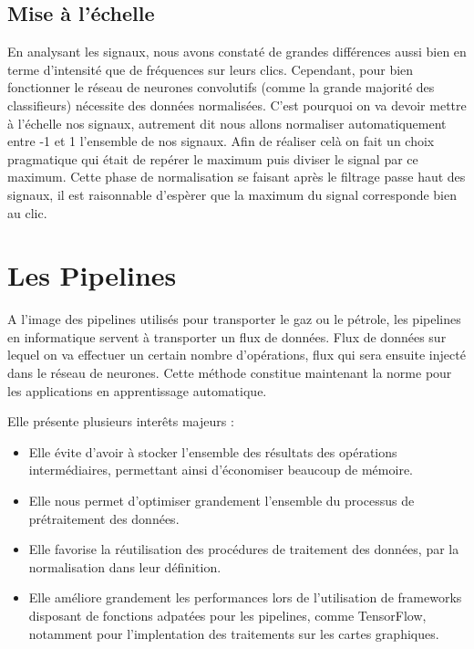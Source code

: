 \hypertarget{Mise-a-l-echelle}{%
\subsection{Mise à l'échelle}
\label{Mise-a-l-echelle}}

En analysant les signaux, nous avons constaté de grandes différences aussi bien en terme d'intensité que de fréquences sur leurs clics.
Cependant, pour bien fonctionner le réseau de neurones convolutifs (comme la grande majorité des classifieurs) nécessite des données normalisées. 
C'est pourquoi on va devoir mettre à l'échelle nos signaux, autrement dit nous allons normaliser automatiquement entre -1 et 1 l'ensemble de nos signaux.
Afin de réaliser celà on fait un choix pragmatique qui était de repérer le maximum puis diviser le signal par ce maximum. 
Cette phase de normalisation se faisant après le filtrage passe haut des signaux,
il est raisonnable d'espèrer que la maximum du signal corresponde bien au clic.  

\hypertarget{Les-Pipelines}{%
\section{Les Pipelines}
\label{Les-Pipelines}}

A l'image des pipelines utilisés pour transporter le gaz ou le pétrole, 
les pipelines en informatique servent à transporter un flux de données.
Flux de données sur lequel on va effectuer un certain nombre d'opérations, flux qui sera ensuite injecté  dans le réseau de neurones.
Cette méthode constitue maintenant la norme pour les applications en apprentissage automatique.

Elle présente plusieurs interêts majeurs :
\begin{itemize}
\item Elle évite d'avoir à stocker l'ensemble des résultats des opérations intermédiaires, permettant ainsi d'économiser beaucoup de mémoire.
\item Elle nous permet d'optimiser grandement l'ensemble du processus de prétraitement des données.
\item Elle favorise la réutilisation des procédures de traitement des données, par la normalisation dans leur définition. 
\item Elle améliore grandement les performances lors de l'utilisation de frameworks disposant de fonctions adpatées pour les pipelines, comme TensorFlow, notamment pour l'implentation des traitements sur les cartes graphiques.
\end{itemize}

